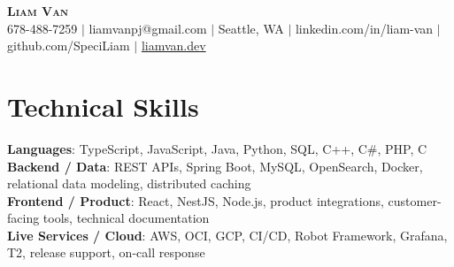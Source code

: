 \documentclass[letterpaper,11pt]{article}
\begin{document}

%
\begin{center}
    \textbf{\Huge \scshape Liam Van} \\ \vspace{1pt}
    \small 678-488-7259 $|$ \small {liamvanpj@gmail.com} $|$ Seattle, WA
 {{$|$ linkedin.com/in/liam-van} {$|$ github.com/SpeciLiam} {$|$ \href{https://liamvan.dev}{liamvan.dev}}}

\end{center}

\section{Technical Skills}
 \begin{itemize}[leftmargin=0.15in, label={}]
    \small{\item{
     \textbf{Languages}{: TypeScript, JavaScript, Java, Python, SQL, C++, C\#, PHP, C} \\
     \textbf{Backend / Data}{: REST APIs, Spring Boot, MySQL, OpenSearch, Docker, relational data modeling, distributed caching} \\
     \textbf{Frontend / Product}{: React, NestJS, Node.js, product integrations, customer-facing tools, technical documentation} \\
     \textbf{Live Services / Cloud}{: AWS, OCI, GCP, CI/CD, Robot Framework, Grafana, T2, release support, on-call response} \\
    }}
 \end{itemize}
%

\end{document}
